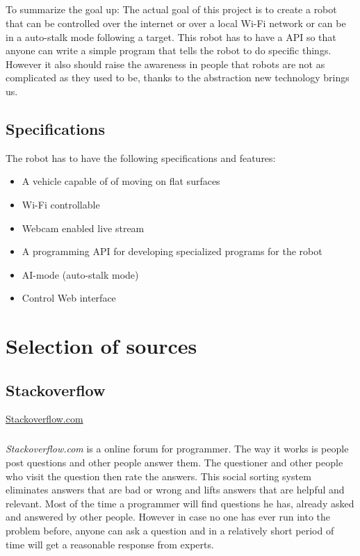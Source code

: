 \documentclass[12pt,a4paper]{report}
\begin{document}
\paragraph{}
To summarize the goal up: The actual goal of this project is to create a robot that can be controlled over the internet or over a local Wi-Fi network or can be in a auto-stalk mode following a target. This robot has to have a API so that anyone can write a simple program that tells the robot to do specific things. However it also should raise the awareness in people that robots are not as complicated as they used to be, thanks to the abstraction new technology brings us.

\section{Specifications}

The robot has to have the following specifications and features:

\hypertarget{specifications}{}
\begin{itemize}
	\item A vehicle capable of of moving on flat surfaces
	\item Wi-Fi controllable
	\item Webcam enabled live stream
	\item A programming API for developing specialized programs for the robot
	\item AI-mode (auto-stalk mode)
	\item Control Web interface
\end{itemize}



\chapter{Selection of sources}

\section{Stackoverflow}
\href{http://stackoverflow.com/}{Stackoverflow.com}

\paragraph{}
\textit{Stackoverflow.com} is a online forum for programmer. The way it works is people post questions and other people answer them. The questioner and other people who visit the question then rate the answers. This social sorting system eliminates answers that are bad or wrong and lifts answers that are helpful and relevant. Most of the time a programmer will find questions he has, already asked and answered by other people. However in case no one has ever run into the problem before, anyone can ask a question and in a relatively short period of time will get a reasonable response from experts.
\end{document}
